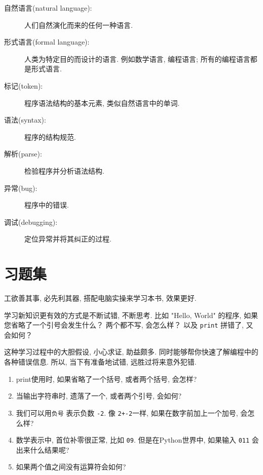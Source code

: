 \documentclass[10pt]{book}
\begin{document}
\begin{description}
\item[自然语言(natural language):] 人们自然演化而来的任何一种语言. 

\item[形式语言(formal language):] 人类为特定目的而设计的语言. 
例如数学语言, 编程语言; 所有的编程语言都是形式语言. 

\item[标记(token):] 程序语法结构的基本元素, 类似自然语言中的单词. 

\item[语法(syntax):] 程序的结构规范. 

\item[解析(parse):] 检验程序并分析语法结构. 

\item[异常(bug):] 程序中的错误. 

\item[调试(debugging):] 定位异常并将其纠正的过程. 

\end{description}


\section{习题集}

\begin{exercise}

工欲善其事, 必先利其器, 搭配电脑实操来学习本书, 效果更好. 

学习新知识更有效的方式是不断试错, 不断思考. 比如 "Hello, World" 的程序, 
如果您省略了一个引号会发生什么？
两个都不写, 会怎么样？
以及 {\tt print} 拼错了, 又会如何？

这种学习过程中的大胆假设, 小心求证, 助益颇多. 
同时能够帮你快速了解编程中的各种错误信息. 
所以, 当下有准备地试错, 远胜过将来意外犯错. 

\begin{enumerate}

\item print使用时, 如果省略了一个括号, 或者两个括号, 会怎样?

\item 当输出字符串时, 遗落了一个, 或者两个引号, 会如何? 

\item 我们可以用{\tt 负号} 表示负数 {\tt -2}. 
像 {\tt 2+-2}一样, 如果在数字前加上一个加号, 会怎么样? 


\item 数学表示中, 首位补零很正常, 比如 {\tt09}. 
但是在Python世界中, 如果输入 {\tt 011} 会出来什么结果呢?

\item 如果两个值之间没有运算符会如何? 

\end{enumerate}

\end{exercise}
\end{document}
